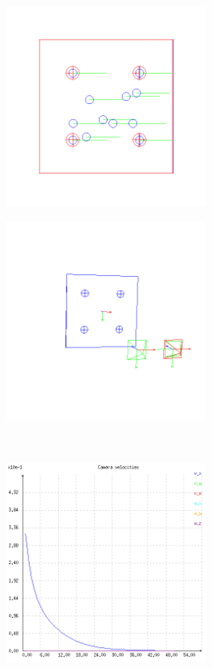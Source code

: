 \begin{figure}[ht!]
\begin{mdframed}[linecolor=black!30,backgroundcolor=black!5]
  \centering
  \begin{subfigure}{.48\linewidth}
    \centering
    \includegraphics[width=65mm]{figures/plots/ex1pimage.png}
    \caption{}
    \label{fig:ex1pimage}
  \end{subfigure}
  \begin{subfigure}{.48\linewidth}
    \centering
    \includegraphics[width=65mm]{figures/plots/ex1pscene.png}
    \caption{}
    \label{fig:ex1pscene}
  \end{subfigure}
  \\
  \begin{subfigure}{.48\linewidth}
    \centering
    \includegraphics[width=65mm]{figures/plots/ex1pvelocity.png}

\end{subfigure}
\end{mdframed}
\end{figure}
